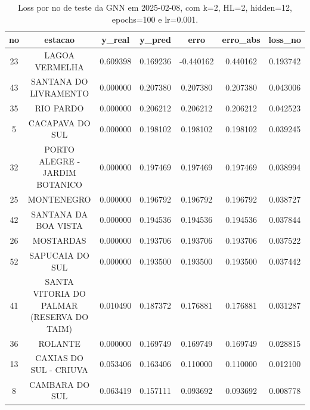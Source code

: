 \begin{table}[h]
\centering
\caption{Loss por no de teste da GNN em 2025-02-08, com k=2, HL=2, hidden=12, epochs=100 e lr=0.001.}
\label{tab:gnn_loss_k2_hl2_h12_e100_d20250208}
\begin{tabular}{ccccccc}
\toprule
no & estacao & y\_real & y\_pred & erro & erro\_abs & loss\_no \\
\midrule
23 & LAGOA VERMELHA & 0.609398 & 0.169236 & -0.440162 & 0.440162 & 0.193742 \\
43 & SANTANA DO LIVRAMENTO & 0.000000 & 0.207380 & 0.207380 & 0.207380 & 0.043006 \\
35 & RIO PARDO & 0.000000 & 0.206212 & 0.206212 & 0.206212 & 0.042523 \\
5 & CACAPAVA DO SUL & 0.000000 & 0.198102 & 0.198102 & 0.198102 & 0.039245 \\
32 & PORTO ALEGRE - JARDIM BOTANICO & 0.000000 & 0.197469 & 0.197469 & 0.197469 & 0.038994 \\
25 & MONTENEGRO & 0.000000 & 0.196792 & 0.196792 & 0.196792 & 0.038727 \\
42 & SANTANA DA BOA VISTA & 0.000000 & 0.194536 & 0.194536 & 0.194536 & 0.037844 \\
26 & MOSTARDAS & 0.000000 & 0.193706 & 0.193706 & 0.193706 & 0.037522 \\
52 & SAPUCAIA DO SUL & 0.000000 & 0.193500 & 0.193500 & 0.193500 & 0.037442 \\
41 & SANTA VITORIA DO PALMAR (RESERVA DO TAIM) & 0.010490 & 0.187372 & 0.176881 & 0.176881 & 0.031287 \\
36 & ROLANTE & 0.000000 & 0.169749 & 0.169749 & 0.169749 & 0.028815 \\
13 & CAXIAS DO SUL - CRIUVA & 0.053406 & 0.163406 & 0.110000 & 0.110000 & 0.012100 \\
8 & CAMBARA DO SUL & 0.063419 & 0.157111 & 0.093692 & 0.093692 & 0.008778 \\
\bottomrule
\end{tabular}
\end{table}

